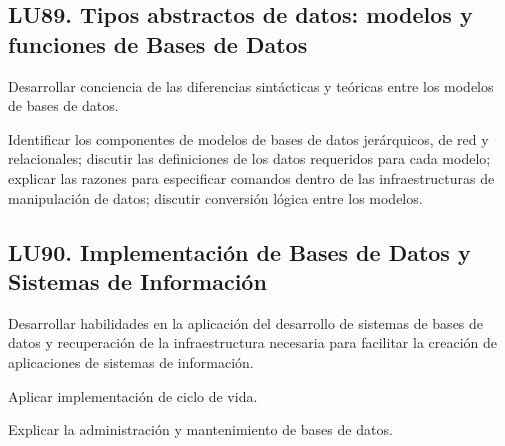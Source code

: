 \subsection{LU89. Tipos abstractos de datos: modelos y funciones de Bases de Datos}\label{sec:BOK-LU89}\label{sec:LU89}
\begin{LearningUnit}
\begin{LUGoal}
\item Desarrollar conciencia de las diferencias sintácticas y teóricas entre los modelos de bases de datos.
\end{LUGoal}

\begin{LUObjective}
\item Identificar los componentes de modelos de bases de datos jerárquicos, de red y relacionales; discutir las definiciones de los datos requeridos para cada modelo; explicar las razones para especificar comandos dentro de las infraestructuras de manipulación de datos; discutir conversión lógica entre los modelos.
\end{LUObjective}
\end{LearningUnit}

\subsection{LU90. Implementación de Bases de Datos y Sistemas de Información}\label{sec:BOK-LU90}\label{sec:LU90}
\begin{LearningUnit}
\begin{LUGoal}
\item Desarrollar habilidades en la aplicación del desarrollo de sistemas de bases de datos y recuperación de la infraestructura necesaria para facilitar la creación de aplicaciones de sistemas de información.
\end{LUGoal}

\begin{LUObjective}
\item Aplicar implementación de ciclo de vida.
\item Explicar la administración y mantenimiento de bases de datos.
\end{LUObjective}
\end{LearningUnit}

